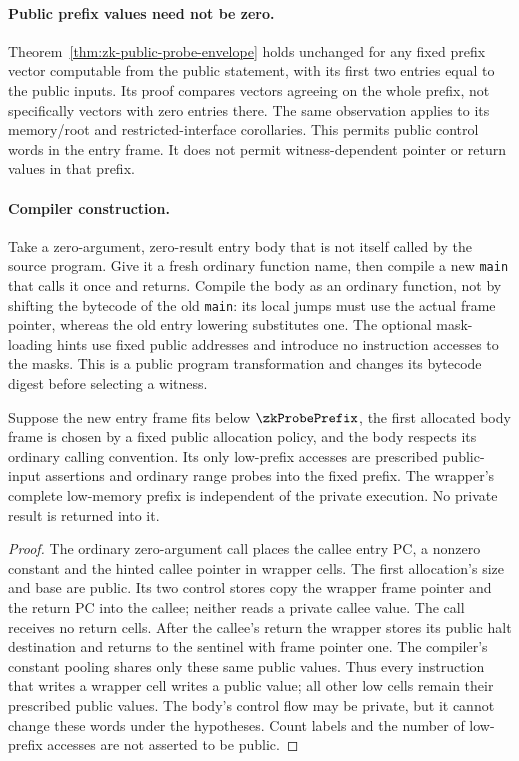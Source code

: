 \paragraph{Public prefix values need not be zero.} Theorem~\ref{thm:zk-public-probe-envelope} holds unchanged for any fixed prefix vector computable from the public statement, with its first two entries equal to the public inputs. Its proof compares vectors agreeing on the whole prefix, not specifically vectors with zero entries there. The same observation applies to its memory/root and restricted-interface corollaries. This permits public control words in the entry frame. It does not permit witness-dependent pointer or return values in that prefix.

\paragraph{Compiler construction.} Take a zero-argument, zero-result entry body that is not itself called by the source program. Give it a fresh ordinary function name, then compile a new \texttt{main} that calls it once and returns. Compile the body as an ordinary function, not by shifting the bytecode of the old \texttt{main}: its local jumps must use the actual frame pointer, whereas the old entry lowering substitutes one. The optional mask-loading hints use fixed public addresses and introduce no instruction accesses to the masks. This is a public program transformation and changes its bytecode digest before selecting a witness.

\begin{lemma}\label{lem:zk-public-entry-wrapper}
Suppose the new entry frame fits below $\zkProbePrefix$, the first allocated body frame is chosen by a fixed public allocation policy, and the body respects its ordinary calling convention. Its only low-prefix accesses are prescribed public-input assertions and ordinary range probes into the fixed prefix. The wrapper's complete low-memory prefix is independent of the private execution. No private result is returned into it.
\end{lemma}
\begin{proof}
The ordinary zero-argument call places the callee entry PC, a nonzero constant and the hinted callee pointer in wrapper cells. The first allocation's size and base are public. Its two control stores copy the wrapper frame pointer and the return PC into the callee; neither reads a private callee value. The call receives no return cells. After the callee's return the wrapper stores its public halt destination and returns to the sentinel with frame pointer one. The compiler's constant pooling shares only these same public values. Thus every instruction that writes a wrapper cell writes a public value; all other low cells remain their prescribed public values. The body's control flow may be private, but it cannot change these words under the hypotheses. Count labels and the number of low-prefix accesses are not asserted to be public.
\end{proof}

